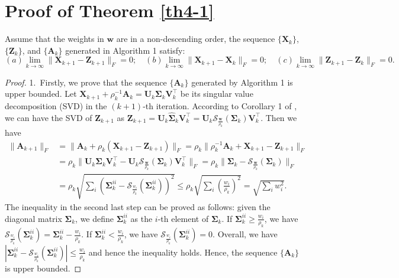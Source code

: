 \section{Proof of Theorem \ref{th4-1}}
\begin{theorem}
Assume that the weights in $\bm{w}$ are in a non-descending order, the sequence $\{\bm{X}_{k}\}$, $\{\bm{Z}_{k}\}$, and $\{\bm{A}_{k}\}$ generated in Algorithm 1 satisfy:
\begin{equation}
(a) \lim_{k \to \infty} \|\bm{X}_{k+1}-\bm{Z}_{k+1}\|_{F}=0;
\quad
(b) \lim_{k \to \infty} \|\bm{X}_{k+1}-\bm{X}_{k}\|_{F}=0;
\quad
(c) \lim_{k \to \infty} \|\bm{Z}_{k+1}-\bm{Z}_{k}\|_{F}=0.
\end{equation}
\end{theorem}
\begin{proof}
1.\ Firstly, we prove that the sequence $\{\bm{A}_{k}\}$ generated by Algorithm 1 is upper bounded.
Let $\bm{X}_{k+1}+\rho_{k}^{-1}\bm{A}_{k}
=
\bm{U}_{k}\bm{\Sigma}_{k}\bm{V}_{k}^{\top}$
be its singular value decomposition (SVD) \cite{eckart1936approximation} in the $(k+1)$-th iteration. According to Corollary 1 of \cite{wnnmijcv}, we can have the SVD of $\bm{Z}_{k+1}$ as $\bm{Z}_{k+1}=\bm{U}_{k}\hat{\bm{\Sigma}}_{k}\bm{V}_{k}^{\top}=\bm{U}_{k}\mathcal{S}_{\frac{\bm{w}}{\rho_{k}}}(\bm{\Sigma}_{k})\bm{V}_{k}^{\top}$. 
Then we have 
\begin{align}
\|
\bm{A}_{k+1}
\|_{F}
&
=
\|
\bm{A}_{k}
+
\rho_{k}
(\bm{X}_{k+1}-\bm{Z}_{k+1})
\|_{F}
=
\rho_{k}\|
\rho_{k}^{-1}
\bm{A}_{k}
+
\bm{X}_{k+1}
-
\bm{Z}_{k+1}
\|_{F}
\\
&
=
\rho_{k}\|
\bm{U}_{k}\bm{\Sigma}_{k}\bm{V}_{k}^{\top}
-
\bm{U}_{k}\mathcal{S}_{\frac{\bm{w}}{\rho_{k}}}(\bm{\Sigma}_{k})\bm{V}_{k}^{\top}
\|_{F}
=
\rho_{k}\|
\bm{\Sigma}_{k}
-
\mathcal{S}_{\frac{\bm{w}}{\rho_{k}}}(\bm{\Sigma}_{k})
\|_{F}
\\
&
=
\rho_{k}
\sqrt{\sum_{i}(\bm{\Sigma}_{k}^{ii}-\mathcal{S}_{\frac{w_{i}}{\rho_{k}}}(\bm{\Sigma}_{k}^{ii}))^{2}}
\le
\rho_{k}
\sqrt{\sum_{i}(\frac{w_{i}}{\rho_{k}})^{2}}
=
\sqrt{\sum_{i}w_{i}^{2}}.
\end{align}
The inequality in the second last step can be proved as follows: given the diagonal matrix $\bm{\Sigma}_{k}$, we define $\bm{\Sigma}_{k}^{ii}$ as the $i$-th element of $\bm{\Sigma}_{k}$. If $\bm{\Sigma}_{k}^{ii}\ge\frac{w_{i}}{\rho_{k}}$, we have $\mathcal{S}_{\frac{w_{i}}{\rho_{k}}}(\bm{\Sigma}_{k}^{ii})=\bm{\Sigma}_{k}^{ii}-\frac{w_{i}}{\rho_{k}}$. If $\bm{\Sigma}_{k}^{ii}<\frac{w_{i}}{\rho_{k}}$, we have $\mathcal{S}_{\frac{w_{i}}{\rho_{k}}}(\bm{\Sigma}_{k}^{ii})=0$. Overall, we have $|\bm{\Sigma}_{k}^{ii}-\mathcal{S}_{\frac{w_{i}}{\rho_{k}}}(\bm{\Sigma}_{k}^{ii})|\le\frac{w_{i}}{\rho_{k}}$ and hence the inequality holds. Hence, the sequence $\{\bm{A}_{k}\}$ is upper bounded.


\end{proof}
